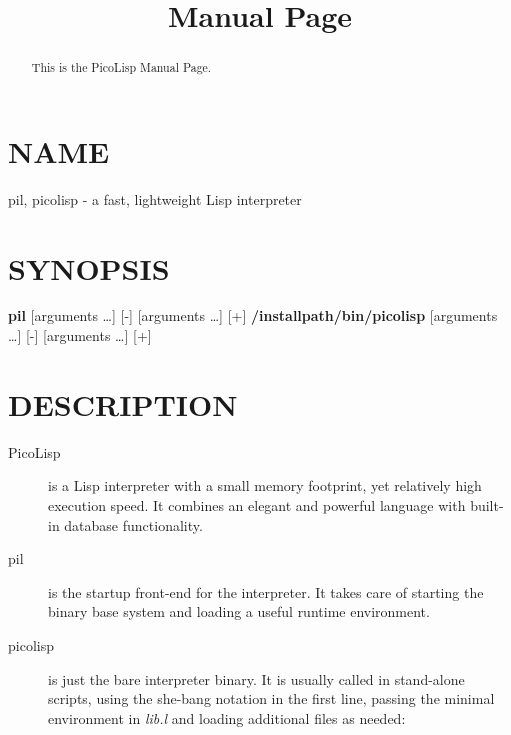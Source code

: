 \title{Manual Page}

\maketitle


\begin{abstract}
  This is the PicoLisp Manual Page.
\end{abstract}

\section{NAME}
\label{sec:manpage-name}


pil, picolisp - a fast, lightweight Lisp interpreter

 
\section{SYNOPSIS}
\label{sec:manpage-synopsis}


\textbf{pil} [arguments \ldots{}] [-] [arguments \ldots{}] [+]
 \textbf{/installpath/bin/picolisp} [arguments \ldots{}] [-] [arguments \ldots{}] [+]

 
\section{DESCRIPTION}
\label{sec:manpage-description}

\begin{description}

\item[PicoLisp] is a Lisp interpreter with a small memory footprint, yet
relatively high execution speed. It combines an elegant and powerful
language with built-in database functionality.

\item[pil] is the startup front-end for the interpreter. It takes care of
starting the binary base system and loading a useful runtime
environment.

\item[picolisp] is just the bare interpreter binary. It is usually called in
stand-alone scripts, using the she-bang notation in the first line,
passing the minimal environment in \emph{lib.l} and loading additional files
as needed:

\end{description}

